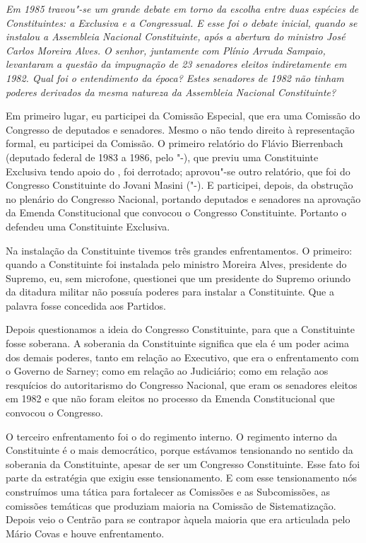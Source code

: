 \medskip

\noindent\emph{Em 1985 travou"-se um grande debate em torno da escolha entre
duas espécies de Constituintes: a Exclusiva e a Congressual. E esse foi
o debate inicial, quando se instalou a Assembleia Nacional Constituinte,
após a abertura do ministro José Carlos Moreira Alves. O senhor,
juntamente com Plínio Arruda Sampaio, levantaram a questão da impugnação
de 23 senadores eleitos indiretamente em 1982. Qual foi o entendimento
da época? Estes senadores de 1982 não tinham poderes derivados da mesma
natureza da Assembleia Nacional Constituinte?}

Em primeiro lugar, eu participei da Comissão Especial,
que era uma Comissão do Congresso de deputados e senadores. Mesmo o 
não tendo direito à representação formal, eu participei da Comissão. O
primeiro relatório do Flávio Bierrenbach (deputado federal de 1983 a
1986, pelo "-), que previu uma Constituinte Exclusiva tendo apoio
do , foi derrotado; aprovou"-se outro relatório, que foi
do Congresso Constituinte do Jovani Masini ("-). E participei,
depois, da obstrução no plenário do Congresso Nacional, portando
deputados e senadores na aprovação da Emenda Constitucional que convocou
o Congresso Constituinte. Portanto o  defendeu uma Constituinte
Exclusiva.

Na instalação da Constituinte tivemos três grandes enfrentamentos. O
primeiro: quando a Constituinte foi instalada pelo ministro Moreira
Alves, presidente do Supremo, eu, sem microfone, questionei que um
presidente do Supremo oriundo da ditadura militar não possuía
poderes para instalar a Constituinte. Que a palavra fosse concedida aos
Partidos.

Depois questionamos a ideia do Congresso Constituinte, para que a
Constituinte fosse soberana. A soberania da Constituinte significa que
ela é um poder acima dos demais poderes, tanto em relação ao Executivo,
que era o enfrentamento com o Governo de Sarney; como em relação ao
Judiciário; como em relação aos resquícios do autoritarismo do Congresso
Nacional, que eram os senadores eleitos em 1982 e que não foram eleitos
no processo da Emenda Constitucional que convocou o Congresso.

O terceiro enfrentamento foi o do regimento interno. O regimento interno
da Constituinte é o mais democrático, porque estávamos tensionando no
sentido da soberania da Constituinte, apesar de ser um Congresso
Constituinte. Esse fato foi parte da estratégia que exigiu esse
tensionamento. E com esse tensionamento nós construímos uma tática para
fortalecer as Comissões e as Subcomissões, as comissões temáticas que
produziam maioria na Comissão de Sistematização. Depois veio o Centrão
para se contrapor àquela maioria que era articulada pelo Mário Covas e
houve enfrentamento.

